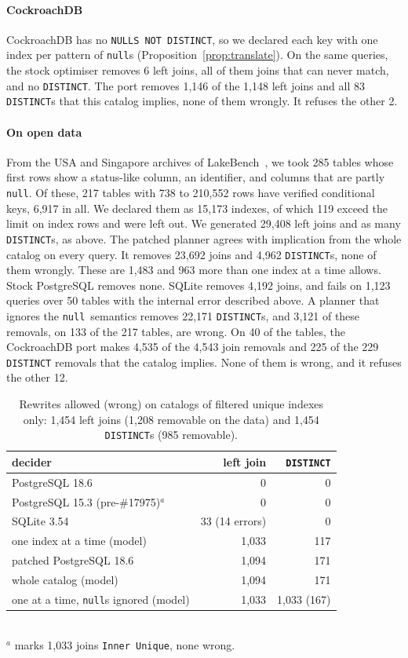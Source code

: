 \documentclass[conference]{IEEEtran}
\theoremstyle{definition}
\newcommand{\sql}[1]{\texttt{#1}}
\newcommand{\nul}{\texttt{null}}
\begin{document}
\else
\paragraph*{CockroachDB} CockroachDB has no \sql{NULLS NOT DISTINCT}, so we declared each key with one index per
pattern of \nul s (Proposition~\ref{prop:translate}). On the same queries, the stock optimiser removes 6 left joins, all
of them joins that can never match, and no \sql{DISTINCT}. The port removes 1{,}146 of the 1{,}148 left joins and all 83
\sql{DISTINCT}s that this catalog implies, none of them wrongly. It refuses the other 2.

\fi
\paragraph*{On open data} From the USA and Singapore archives of LakeBench~\cite{LakeBench}, we took 285 tables whose
first rows show a status-like column, an identifier, and columns that are partly \nul. Of these, 217 tables with 738 to
210{,}552 rows have verified conditional keys, 6{,}917 in all. We declared them as 15{,}173 indexes, of which 119 exceed
the limit on index rows and were left out. We generated 29{,}408 left joins and as many \sql{DISTINCT}s, as above. The
patched planner agrees with implication from the whole catalog on every query. It removes 23{,}692 joins and 4{,}962
\sql{DISTINCT}s, none of them wrongly. These are 1{,}483 and 963 more than one index at a time allows. Stock PostgreSQL
removes none. SQLite removes 4{,}192 joins, and fails on 1{,}123 queries over 50 tables with the internal error
described above. A planner that ignores the \nul\ semantics removes 22{,}171 \sql{DISTINCT}s, and 3{,}121 of these
removals, on 133 of the 217 tables, are wrong. On 40 of the tables, the CockroachDB port makes 4{,}535 of the 4{,}543 join
removals and 225 of the 229 \sql{DISTINCT} removals that the catalog implies. None of them is wrong, and it refuses the
other 12.
\begin{table}[t]\centering\small\setlength{\tabcolsep}{4pt}
\caption{Rewrites allowed (wrong) on catalogs of filtered unique indexes only: 1{,}454 left
joins (1{,}208 removable on the data) and 1{,}454 \sql{DISTINCT}s (985 removable).}\label{tab:x4}
\begin{tabular}{@{}lrr@{}}\toprule
decider & left join & \sql{DISTINCT}\\\midrule
PostgreSQL 18.6 & 0 & 0\\
PostgreSQL 15.3 (pre-\#17975)$^a$ & 0 & 0\\
SQLite 3.54 & 33 (14 errors) & 0\\
one index at a time (model) & 1{,}033 & 117\\
patched PostgreSQL 18.6 & 1{,}094 & 171\\
whole catalog (model) & 1{,}094 & 171\\
one at a time, \nul s ignored (model) & 1{,}033 & 1{,}033 (167)\\\bottomrule
\end{tabular}
\\[2pt]{\footnotesize $^a$ marks 1{,}033 joins \sql{Inner Unique}, none wrong.}\end{table}
\end{document}
